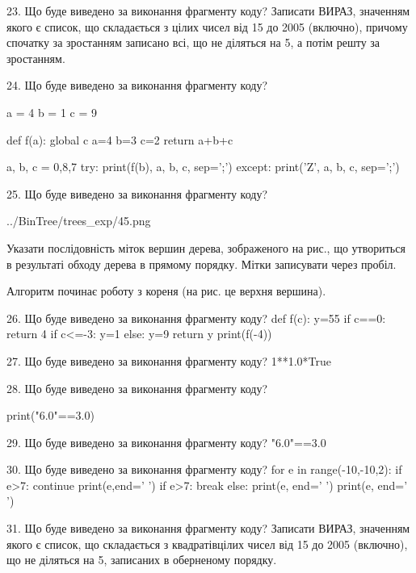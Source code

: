 \documentclass[11pt]{article}
\begin{document}

23. Що буде виведено за виконання фрагменту коду?
Записати ВИРАЗ, значенням якого є список, що складається з цілих чисел від 15 до 2005 (включно), причому спочатку за зростанням записано всі, що не діляться на 5, а потім решту за зростанням.


24. Що буде виведено за виконання фрагменту коду?

a = 4
b = 1
c = 9

def f(a):
global c    a=4
    b=3
    c=2
    return a+b+c

a, b, c = 0,8,7
try:
    print(f(b), a, b, c, sep=';')
except:
    print('Z', a, b, c, sep=';')


25. Що буде виведено за виконання фрагменту коду?

\begin{center}
	{../BinTree/trees_exp/45.png}
\end{center}
Указати послідовність міток вершин дерева, зображеного на рис., що утвориться в результаті обходу дерева в прямому порядку. Мітки записувати через пробіл.\par Алгоритм починає роботу з кореня (на рис. це верхня вершина).


26. Що буде виведено за виконання фрагменту коду?
def f(c):
      y=55
      if c==0: return 4
      if c<=-3: y=1
      else: y=9
      return y
   print(f(-4))

27. Що буде виведено за виконання фрагменту коду?
1**1.0*True

28. Що буде виведено за виконання фрагменту коду?

print("6.0"==3.0)


29. Що буде виведено за виконання фрагменту коду?
"6.0"==3.0

30. Що буде виведено за виконання фрагменту коду?
for e in range(-10,-10,2):
    if e>7:
        continue
        print(e,end=' ')
    if e>7:
        break
else:
    print(e, end=' ')
print(e, end=' ')


31. Що буде виведено за виконання фрагменту коду?
Записати ВИРАЗ, значенням якого є список, що складається з квадратівцілих чисел від 15 до 2005 (включно), що не діляться на 5, записаних в обернено\-му порядку.
\end{document}

